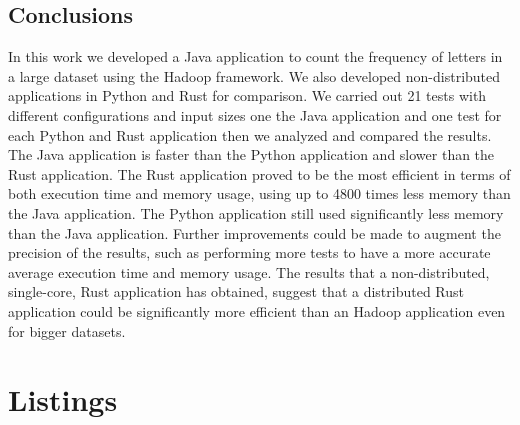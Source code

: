 \documentclass{article}
\begin{document}
\begin{multicols}{2}

\section{Conclusions}
    In this work we developed a Java application to count the frequency of letters in a large dataset
    using the Hadoop framework. We also developed non-distributed applications in Python and Rust for
    comparison.
    We carried out 21 tests with different configurations and input sizes one the Java application
    and one test for each Python and Rust application then we analyzed and compared the results.
    The Java application is faster than the Python application and slower than the Rust application.
    The Rust application proved to be the most efficient in terms of both execution time and memory usage,
    using up to 4800 times less memory than the Java application. 
    The Python application still used significantly less memory than the Java application.
    Further improvements could be made to augment the precision of the results, such as performing
    more tests to have a more accurate average execution time and memory usage.
    The results that a non-distributed, single-core, Rust application has obtained, suggest that 
    a distributed Rust application could be significantly more efficient than an Hadoop application
    even for bigger datasets.
\end{multicols}
\section{Listings}








\end{document}
